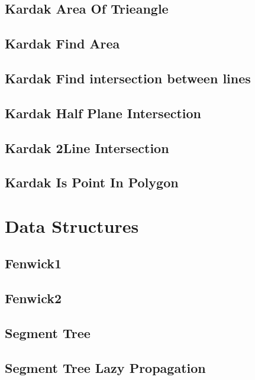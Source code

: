 \documentclass[a4paper,landscape]{article}
\begin{document}
\begin{multicols}{2}
\subsection{Kardak Area Of Trieangle}
	
\subsection{Kardak Find Area}
	
\subsection{Kardak Find intersection between lines}
	
\subsection{Kardak Half Plane Intersection}
	
\subsection{Kardak 2Line Intersection}
	
\subsection{Kardak Is Point In Polygon}
	


\section{Data Structures}
\subsection{Fenwick1}
	
\subsection{Fenwick2}
	
\subsection{Segment Tree}
	
\subsection{Segment Tree Lazy Propagation}
	

\end{multicols}
\end{document}
